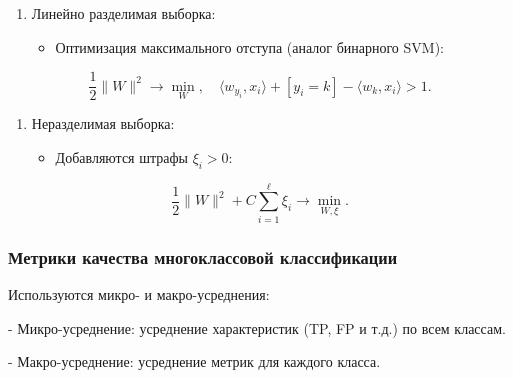 \begin{enumerate}
\def\labelenumi{\arabic{enumi}.}
\setcounter{enumi}{1}
\tightlist
\item
  Линейно разделимая выборка:

  \begin{itemize}
  \tightlist
  \item
    Оптимизация максимального отступа (аналог бинарного SVM):
  \end{itemize}
\end{enumerate}

\begin{equation}
\frac{1}{2} \|W\|^2 \to \min_W, \quad \langle w_{y_i}, x_i \rangle + [y_i = k] - \langle w_k, x_i \rangle > 1.
\end{equation}

\begin{enumerate}
\def\labelenumi{\arabic{enumi}.}
\setcounter{enumi}{2}
\tightlist
\item
  Неразделимая выборка:

  \begin{itemize}
  \tightlist
  \item
    Добавляются штрафы \(\xi_i > 0\):
  \end{itemize}
\end{enumerate}

\begin{equation}
\frac{1}{2} \|W\|^2 + C \sum_{i=1}^\ell \xi_i \to \min_{W, \xi}.
\end{equation}

\hypertarget{ux43cux435ux442ux440ux438ux43aux438-ux43aux430ux447ux435ux441ux442ux432ux430-ux43cux43dux43eux433ux43eux43aux43bux430ux441ux441ux43eux432ux43eux439-ux43aux43bux430ux441ux441ux438ux444ux438ux43aux430ux446ux438ux438}{%
\subsubsection*{Метрики качества многоклассовой
классификации}\label{ux43cux435ux442ux440ux438ux43aux438-ux43aux430ux447ux435ux441ux442ux432ux430-ux43cux43dux43eux433ux43eux43aux43bux430ux441ux441ux43eux432ux43eux439-ux43aux43bux430ux441ux441ux438ux444ux438ux43aux430ux446ux438ux438}}

Используются микро- и макро-усреднения: 

- Микро-усреднение:
усреднение характеристик (TP, FP и т.д.) по всем классам. 

- Макро-усреднение: усреднение метрик для каждого класса.

